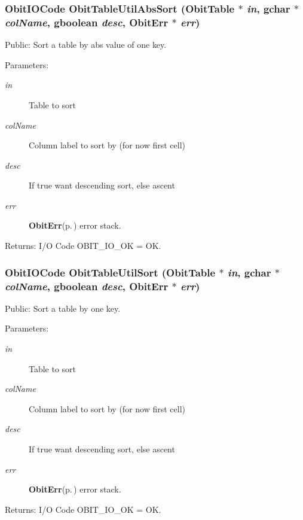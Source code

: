 \subsubsection{\setlength{\rightskip}{0pt plus 5cm}Obit\-IOCode Obit\-Table\-Util\-Abs\-Sort ({\bf Obit\-Table} $\ast$ {\em in}, gchar $\ast$ {\em col\-Name}, gboolean {\em desc}, {\bf Obit\-Err} $\ast$ {\em err})}\label{ObitTableUtil_8c_a14}


Public: Sort a table by abs value of one key. 

\begin{Desc}
\item[Parameters:]
\begin{description}
\item[{\em in}]Table to sort \item[{\em col\-Name}]Column label to sort by (for now first cell) \item[{\em desc}]If true want descending sort, else ascent \item[{\em err}]{\bf Obit\-Err}{\rm (p.\,\pageref{structObitErr})} error stack. \end{description}
\end{Desc}
\begin{Desc}
\item[Returns:]I/O Code OBIT\_\-IO\_\-OK = OK. \end{Desc}
\subsubsection{\setlength{\rightskip}{0pt plus 5cm}Obit\-IOCode Obit\-Table\-Util\-Sort ({\bf Obit\-Table} $\ast$ {\em in}, gchar $\ast$ {\em col\-Name}, gboolean {\em desc}, {\bf Obit\-Err} $\ast$ {\em err})}\label{ObitTableUtil_8c_a13}


Public: Sort a table by one key. 

\begin{Desc}
\item[Parameters:]
\begin{description}
\item[{\em in}]Table to sort \item[{\em col\-Name}]Column label to sort by (for now first cell) \item[{\em desc}]If true want descending sort, else ascent \item[{\em err}]{\bf Obit\-Err}{\rm (p.\,\pageref{structObitErr})} error stack. \end{description}
\end{Desc}
\begin{Desc}
\item[Returns:]I/O Code OBIT\_\-IO\_\-OK = OK. \end{Desc}
